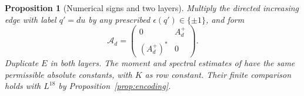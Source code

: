 \documentclass[11pt]{article}
\newtheorem{proposition}[theorem]{Proposition}
\theoremstyle{definition}
\theoremstyle{remark}
\numberwithin{equation}{section}
\begin{document}
\begin{proposition}[Numerical signs and two layers]\label{prop:phase}
Multiply the directed increasing edge with label $q'=du$ by any prescribed $\epsilon(q')\in\{\pm1\}$, and form
\begin{equation}\label{eq:phase-lift}
 \mathcal A_d=\begin{pmatrix}0&A_d^+\\(A_d^+)^*&0\end{pmatrix}.
\end{equation}
Duplicate $E$ in both layers. The moment and spectral estimates of
\cite[Theorem~5.4 and Proposition~8.3, pp.~24, 41]{OpenAI007} have the same permissible absolute constants,
with $K$ as row constant. Their finite comparison holds with $L^{18}$ by Proposition~\ref{prop:encoding}.
\end{proposition}
\end{document}
